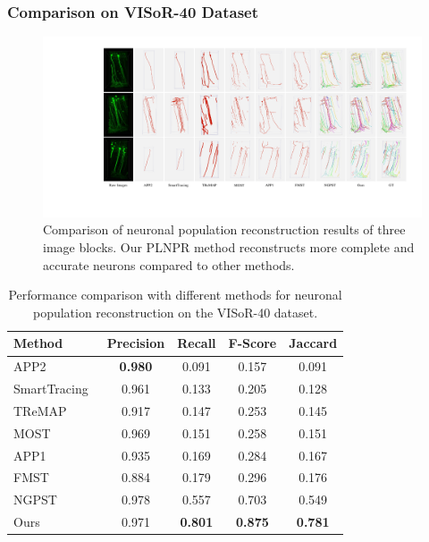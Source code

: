 \subsubsection{Comparison on VISoR-40 Dataset}



\begin{figure}[t]
	\centering
	\includegraphics[width=1\textwidth]{./Illustrations/iteration3.pdf}
	\caption{Comparison of neuronal population reconstruction results of three image blocks. %
Our PLNPR method reconstructs more complete and accurate neurons compared to other methods. 
	}
	\label{fig:compare_VISoR}
\end{figure}



\begin{table}[th]
	\centering
	\caption{Performance comparison with different methods for neuronal population reconstruction on the VISoR-40 dataset.}
	\label{table:compare_VISoR}
	\begin{tabular}{lcccc}
		\toprule
		Method & Precision & Recall & F-Score & Jaccard\\
		\midrule
		APP2~\cite{Xiao2013}
		& \textbf{0.980} & 0.091 & 0.157 & 0.091\\
		SmartTracing~\cite{Chen2015}
		& 0.961 & 0.133 & 0.205 & 0.128\\
		TReMAP~\cite{Zhou2016}
		& 0.917 & 0.147 & 0.253 & 0.145\\
		MOST~\cite{Wu2014}          
		& 0.969 & 0.151& 0.258& 0.151\\
		APP1~\cite{Peng2011}
		& 0.935 & 0.169 & 0.284 & 0.167\\
		FMST~\cite{Yang2019}
		& 0.884 & 0.179 & 0.296 &  0.176\\
		NGPST~\cite{Quan2015}
		& 0.978 & 0.557& 0.703 & 0.549\\
		\midrule
		Ours
		& 0.971 & \textbf{0.801}&\textbf{0.875} & \textbf{0.781}\\
		\bottomrule
	\end{tabular}
\end{table}

